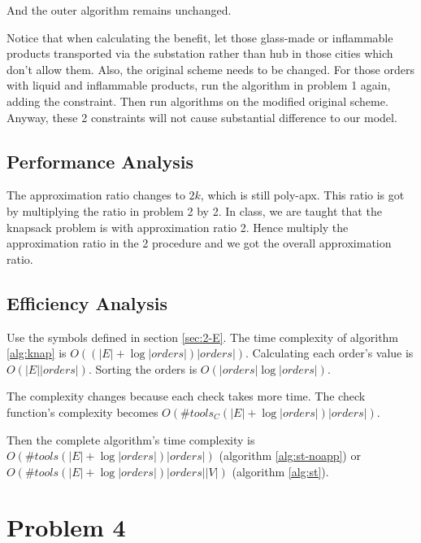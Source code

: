 \documentclass[11pt, a4paper]{article} %
\begin{document}
	And the outer algorithm remains unchanged.
	
	Notice that when calculating the benefit, let those glass-made or inflammable products transported via the substation rather than hub in those cities which don't allow them.  Also, the original scheme needs to be changed. For those orders with liquid and inflammable products, run the algorithm in problem 1 again, adding the constraint. Then run algorithms on the modified original scheme. Anyway, these 2 constraints will not cause substantial difference to our model.
	\subsection{Performance Analysis}
	The approximation ratio changes to $2k$, which is still poly-apx. This ratio is got by multiplying the ratio in problem 2 by 2. In class, we are taught that the knapsack problem is with approximation ratio 2. Hence multiply the approximation ratio in the 2 procedure and we got the overall approximation ratio.
	
	\subsection{Efficiency Analysis}
	 Use the symbols defined in section \ref{sec:2-E}. The time complexity of algorithm \ref{alg:knap} is $O((|E|+\log{|orders|})|orders|)$. Calculating each order's value is $O(|E||orders|)$. Sorting the orders is $O(|orders|\log{|orders|})$.
	
	The complexity changes because each check takes more time. The check function's complexity becomes $O(\#tools_C(|E|+\log{|orders|})|orders|)$.
	
	Then the complete algorithm's time complexity is $O(\#tools(|E|+\log{|orders|})|orders|)$ (algorithm \ref{alg:st-noapp}) or $O(\#tools(|E|+\log{|orders|})|orders||V|)$ (algorithm \ref{alg:st}).

\section{Problem 4}
\end{document}
